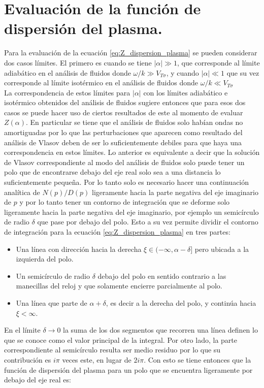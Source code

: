 \documentclass[../tesis_main_file.tex]{subfile}
\begin{document}
\section{Evaluación de la función de dispersión del plasma.}
Para la evaluación de la ecuación \ref{eq:Z_dispersion_plasma} se pueden considerar dos casos límites. El primero es cuando se tiene $|\alpha|\gg 1$, que corresponde al límite adiabático en el análisis de fluidos donde $\omega / k \gg V_{T\sigma}$, y cuando $|\alpha|\ll 1$ que su vez corresponde al límite isotérmico en el análisis de fluidos donde $\omega / k \ll V_{T\sigma}$\\
La correspondencia de estos límites para $|\alpha |$ con los límites adiabático e isotérmico obtenidos del análisis de fluidos sugiere entonces que para esos dos casos se puede hacer uso de ciertos resultados de este al momento de evaluar $Z(\alpha )$. En particular se tiene que el análisis de fluidos solo habían ondas no amortiguadas por lo que las perturbaciones que aparecen como resultado del análisis de Vlasov deben de ser lo suficientemente debiles para que haya una correspondencia en estos límites. Lo anterior es equivalente a decir que la solución de Vlasov correspondiente al modo del análisis de fluidos solo puede tener un polo que de encontrarse debajo del eje real solo sea a una distancia lo suficientemente pequeña. Por lo tanto solo es necesario hacer una continuación analítica de $N(p)/D(p)$ ligeramente hacia la parte negativa del eje imaginario de $p$ y por lo tanto tener un contorno de integración que se deforme solo ligeramente hacia la parte negativa del eje imaginario, por ejemplo un semicírculo de radio $\delta$ que pase por debajo del polo. Esto a su vez permite dividir el contorno de integración para la ecuación \ref{eq:Z_dispersion_plasma} en tres partes:
\begin{itemize}
\item Una línea con dirección hacia la derecha $\xi \in (-\infty , \alpha -\delta ]$ pero ubicada a la izquierda del polo.
\item Un semicírculo de radio $\delta$ debajo del polo en sentido contrario a las manecillas del reloj y que solamente encierre parcialmente al polo.
\item Una línea que parte de $\alpha +\delta$, es decir a la derecha del polo, y continúa hacia $\xi < \infty$.
\end{itemize}
En el límite $\delta \to 0$ la suma de los dos segmentos que recorren una línea definen lo que se conoce como el valor principal de la integral. Por otro lado, la parte correspondiente al semicírculo resulta ser medio residuo por lo que su contribución es $i\pi$ veces este, en lugar de $2i\pi$. Con esto se tiene entonces que la función de dispersión del plasma para un polo que se encuentra ligeramente por debajo del eje real es:
\end{document}
